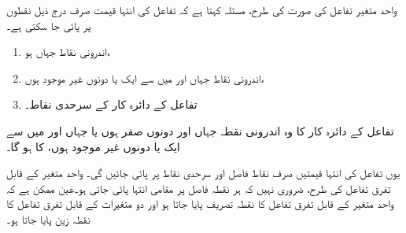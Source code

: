 واحد متغیر تفاعل کی صورت کی  طرح، مسئلہ  کہتا ہے کہ تفاعل  کی  انتہا قیمت صرف درج ذیل  نقطوں پر پائی جا سکتی ہے۔
\begin{enumerate}[1.]
\item
اندرونی نقاط جہاں  ہو،
\item
اندرونی نقاط جہاں  اور  میں سے ایک یا دونوں غیر موجود ہوں،
\item
تفاعل کے دائرہ کار کے سرحدی نقاط۔
\end{enumerate}

تفاعل  کے دائرہ کار  کا     وہ اندرونی نقطہ  جہاں  اور  دونوں  صفر ہوں یا جہاں     اور میں سے ایک یا  دونوں غیر موجود ہوں،  کا  ہو گا۔

یوں  تفاعل   کی انتہا قیمتیں صرف  نقاط فاصل اور سرحدی نقاط  پر پائی جائیں گی۔ واحد متغیر  کے قابل تفرق تفاعل کی طرح، ضروری نہیں کہ ہر نقطہ فاصل پر مقامی انتہا    پائی جاتی ہو۔عین ممکن ہے کہ  واحد متغیر کے قابل تفرق تفاعل کا نقطہ تصریف   پایا جاتا ہو اور دو متغیرات کے قابل تفرق تفاعل  کا نقطہ زین  پایا جاتا ہو۔  

